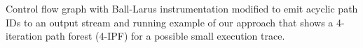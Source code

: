 \label{fig:kblpp-example} Control flow graph with Ball-Larus instrumentation modified to emit acyclic path IDs to an output stream and running example of our approach that shows a 4-iteration path forest (4-IPF) for a possible small execution trace.
